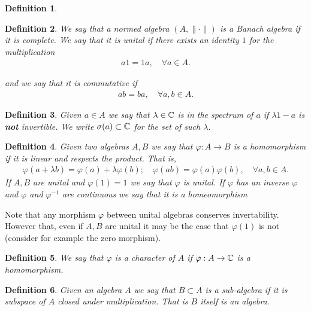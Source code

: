 \documentclass[12pt]{article}
\newtheorem{definition}{Definition}
\renewcommand{\norm}[1]{\lVert #1 \rVert}\renewcommand{\abs}[1]{\left| #1 \right|}
\begin{document}
\begin{CJK*}{UTF8}{gbsn}
\begin{definition}
	\end{definition}
	\begin{definition}
		We say that a normed algebra $(A,\norm{\cdot })$ is a \emph{Banach algebra} if it is complete. We say that it is \emph{unital} if there exists an identity $1$ for the multiplication
		\begin{align}\label{e3}
			a 1=1 a, \quad\forall a\in A.
		\end{align}

		and we say that it is \emph{commutative} if
		\begin{align*}
			ab= ba , \quad\forall a,b \in A.
		\end{align*}
	\end{definition}
	\begin{definition}
		Given $a \in  A$ we say that $\lambda  \in \mathbb{C}$ is in the \emph{spectrum} of $a$ if  $ \lambda 1-a$ is \textbf{not} invertible. We write $\sigma (a) \subset \mathbb{C}$ for the set of such $\lambda $.
	\end{definition}
	\begin{definition}
		Given two algebras $A,B$ we say that  $\varphi: A\to B$ is a \emph{homomorphism} if it is linear and respects the product. That is,
		\begin{align*}
			\varphi(a+ \lambda b)= \varphi(a)+ \lambda  \varphi(b);\quad \varphi(ab)=\varphi(a) \varphi(b) , \quad\forall a ,b \in  A.
		\end{align*}
		If $A,B$ are unital and  $\varphi(1)=1$ we say that $\varphi$ is \emph{unital}. If $\varphi$ has an inverse $\varphi$ and $\varphi$ and $\varphi^{-1}$ are continuous we say that it is a \emph{homeomorphism}
	\end{definition}
	Note that any morphism $\varphi$ between unital algebras conserves invertability. However that, even if $A,B$ are unital it may be the case that  $\varphi(1)$ is not (consider for example the zero morphism).
	\begin{definition}
		We say that $\varphi$ is a character of $A$ if  $\varphi:A\to \mathbb{C}$ is a homomorphism.
	\end{definition}
	\begin{definition}
		Given an algebra $A$ we say that  $B \subset A$ is a sub-algebra if it is subspace of $A$ closed under multiplication.    That is $B$ itself is an algebra.
	\end{definition}


\end{CJK*}
\end{document}
